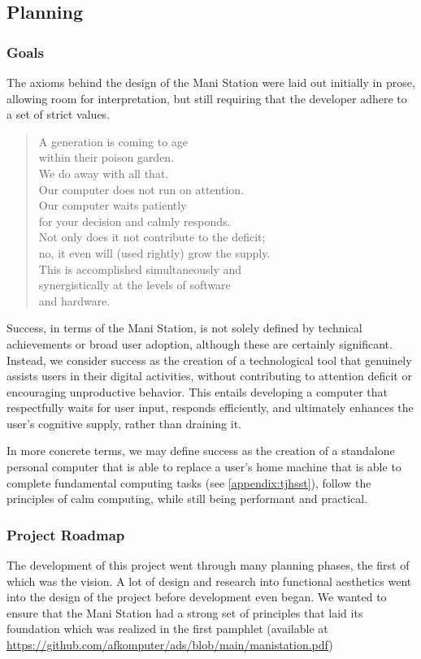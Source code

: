 \documentclass[letterpaper,twocolumn,10pt]{article}
\begin{document}
\subsection{Planning}
\subsubsection{Goals}
The axioms behind the design of the Mani Station were laid out initially in prose, allowing room for interpretation, but still requiring that the developer adhere to a set of strict values.
\begin{quote}
A generation is coming to age \\within their poison garden.\\
We do away with all that.\\
Our computer does not run on attention.\\
Our computer waits patiently\\
for your decision and calmly responds.\\
Not only does it not contribute to the deficit;\\
no, it even will (used rightly) grow the supply.\\
This is accomplished simultaneously and \\synergistically
at the levels of software\\ and hardware.
\end{quote}

Success, in terms of the Mani Station, is not solely defined by technical achievements or broad user adoption, although these are certainly significant. Instead, we consider success as the creation of a technological tool that genuinely assists users in their digital activities, without contributing to attention deficit or encouraging unproductive behavior. This entails developing a computer that respectfully waits for user input, responds efficiently, and ultimately enhances the user's cognitive supply, rather than draining it.

In more concrete terms, we may define success as the creation of a standalone personal computer that is able to replace a user’s home machine that is able to complete fundamental computing tasks (see \ref{appendix:tjhsst}), follow the principles of calm computing, while still being performant and practical.

\subsubsection{Project Roadmap}
The development of this project went through many planning phases, the first of which was the vision. A lot of design and research into functional aesthetics went into the design of the project before development even began. We wanted to ensure that the Mani Station had a strong set of principles that laid its foundation which was realized in the first pamphlet (available at \url{https://github.com/afkomputer/ads/blob/main/manistation.pdf})
\end{document}
